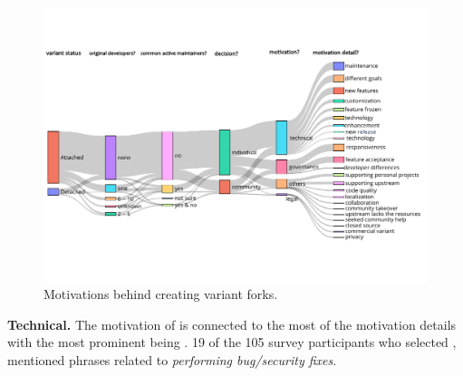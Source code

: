 \begin{figure}[ht]
\begin{center}
    \centering
    \includegraphics[width=\textwidth]{pdfs/sankey_motivations.pdf}
    \caption{Motivations behind creating variant forks.
    }
    \label{fig:sankey_motivation}
\end{center}
\vspace{-.3cm}
\end{figure}


\nd \textbf{Technical.} The motivation of  is connected to the most of the motivation details with the most prominent being . 19 of the 105 survey participants who selected , mentioned phrases related to \emph{performing bug/security fixes}.

